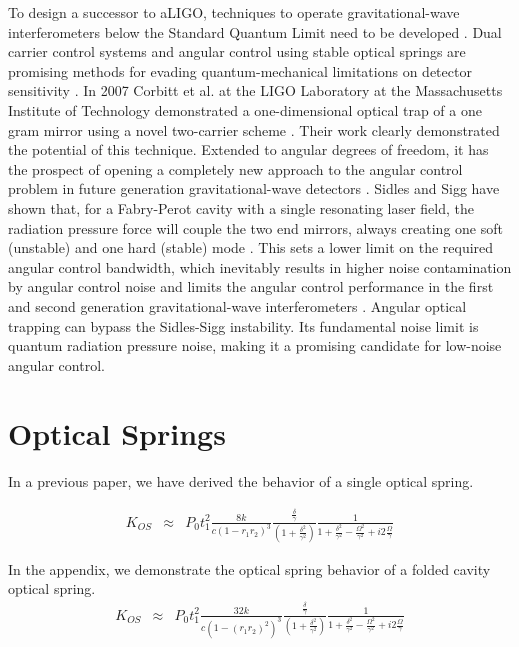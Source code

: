To design a successor to aLIGO, techniques to operate gravitational-wave interferometers below 
the Standard Quantum Limit need to be developed \cite{Dan12, Chen13}. Dual carrier control systems and angular control 
using stable optical springs are promising methods for evading quantum-mechanical limitations on 
detector sensitivity \cite{LIGO10, Braginsky02b, Arcizet06b, Corbitt06b, Kippenberg05, Sheard04}. 
In 2007 Corbitt et al. at the LIGO Laboratory at the Massachusetts Institute of Technology 
demonstrated a one-dimensional optical trap of a one gram mirror using a novel two-carrier scheme \cite{Corbitt07}. 
Their work 
clearly demonstrated the potential of this technique. Extended to angular degrees of freedom, it has 
the prospect of opening a completely new approach to the angular control problem in future generation 
gravitational-wave detectors \cite{Punturo10}. 
Sidles and Sigg have shown that, for a Fabry-Perot cavity with a single 
resonating laser field, the radiation pressure force will couple the two end mirrors, always creating one 
soft (unstable) and one hard (stable) mode \cite{Sidles06}. This sets a lower limit on the required angular control 
bandwidth, which inevitably results in higher noise contamination by angular control noise and limits the angular control performance in the first and second generation 
gravitational-wave interferometers \cite{LIGO10, Braginsky01, Dooley13, Hirose10}. 
Angular optical trapping can bypass the Sidles-Sigg instability. Its fundamental noise limit is quantum radiation pressure noise, making it a promising candidate for low-noise angular control.


\section{Optical Springs}

In a previous paper, we have derived the behavior of a single optical spring.

\begin{eqnarray}
\label{eq:KOSlong}
K_{OS} & {\approx} & P_0 t_1^2 \frac{8k}{c(1-r_1r_2)^3}\frac{ \frac{\delta}{\gamma}}{(1+\frac{\delta^2}{\gamma^2})} 
\frac{1}{1+\frac{\delta^2}{\gamma^2}-\frac{\Omega^2}{\gamma^2}+i2\frac{\Omega}{\gamma} }
\end{eqnarray}

In the appendix, we demonstrate the optical spring behavior of a folded cavity optical spring.
\begin{eqnarray}
\label{eq:KOSfolded}
K_{OS} & {\approx} & P_0 t_1^2 \frac{32k}{c(1-(r_1r_2)^2)^3}\frac{ \frac{\delta}{\gamma}}{(1+\frac{\delta^2}{\gamma^2})} 
\frac{1}{1+\frac{\delta^2}{\gamma^2}-\frac{\Omega^2}{\gamma^2}+i2\frac{\Omega}{\gamma} }
\end{eqnarray}

